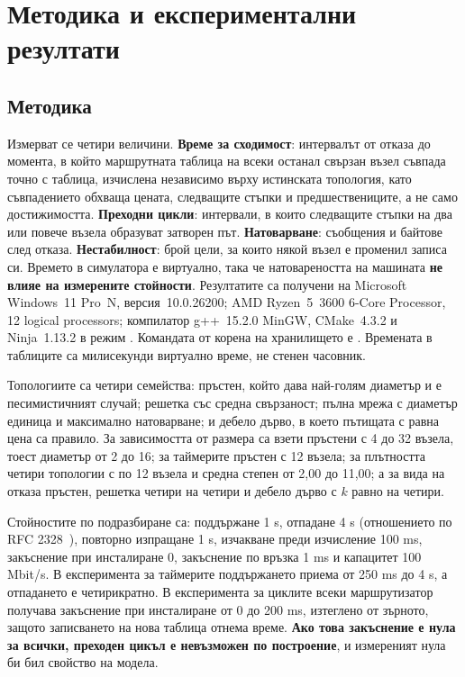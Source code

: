 \section{Методика и експериментални резултати}
\label{sec:results}

\subsection{Методика}

Измерват се четири величини. \textbf{Време за сходимост}: интервалът от отказа до момента, в
който маршрутната таблица на всеки останал свързан възел съвпада точно с таблица, изчислена
независимо върху истинската топология, като съвпадението обхваща цената, следващите стъпки и
предшествениците, а не само достижимостта. \textbf{Преходни цикли}: интервали, в които
следващите стъпки на два или повече възела образуват затворен път. \textbf{Натоварване}:
съобщения и байтове след отказа. \textbf{Нестабилност}: брой цели, за които някой възел е
променил записа си. Времето в симулатора е виртуално, така че натовареността на машината
\textbf{не влияе на измерените стойности}. Резултатите са получени на Microsoft
Windows~11 Pro~N, версия~10.0.26200; AMD Ryzen~5~3600 6-Core Processor, 12 logical
processors; компилатор g++~15.2.0 MinGW, CMake~4.3.2 и Ninja~1.13.2 в режим
. Командата от корена на хранилището е
. Времената в
таблиците са милисекунди виртуално време, не стенен часовник.

Топологиите са четири семейства: пръстен, който дава най-голям диаметър и е песимистичният
случай; решетка със средна свързаност; пълна мрежа с диаметър единица и максимално натоварване;
и дебело дърво, в което пътищата с равна цена са правило. За зависимостта от размера са взети
пръстени с 4 до 32 възела, тоест диаметър от 2 до 16; за таймерите пръстен с 12 възела; за
плътността четири топологии с по 12 възела и средна степен от 2,00 до 11,00; а за вида на
отказа пръстен, решетка четири на четири и дебело дърво с $k$ равно на четири.

Стойностите по подразбиране са: поддържане 1 s, отпадане 4 s (отношението по RFC
2328~\cite{rfc2328}), повторно изпращане 1 s, изчакване преди изчисление 100 ms, закъснение
при инсталиране 0, закъснение по връзка 1 ms и капацитет 100 Mbit/s. В експеримента за
таймерите поддържането приема от 250 ms до 4 s, а отпадането е четирикратно. В експеримента за
циклите всеки маршрутизатор получава закъснение при инсталиране от 0 до 200 ms, изтеглено от
зърното, защото записването на нова таблица отнема време. \textbf{Ако това закъснение е нула за
всички, преходен цикъл е невъзможен по построение}, и измереният нула би бил свойство на модела.


